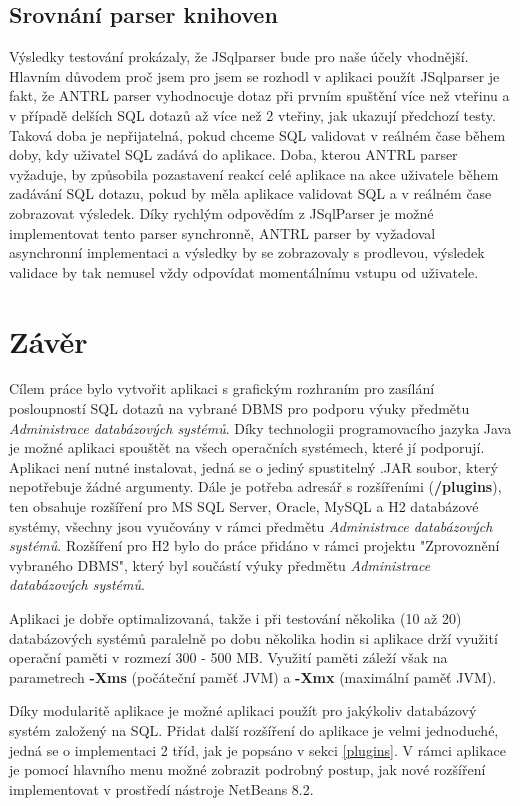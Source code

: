\documentclass[czech,bachelor,public,dept460,male,cpdeclaration,twoside]{diploma}
\begin{document}
\subsection{Srovnání parser knihoven}
Výsledky testování prokázaly, že JSqlparser bude pro naše účely vhodnější. Hlavním důvodem proč jsem pro jsem se rozhodl v aplikaci použít JSqlparser je fakt, že ANTRL parser vyhodnocuje dotaz při prvním spuštění více než vteřinu a v případě delších SQL dotazů až více než 2 vteřiny, jak ukazují předchozí testy. Taková doba je nepřijatelná, pokud chceme SQL validovat v reálném čase během doby, kdy uživatel SQL zadává do aplikace. Doba, kterou ANTRL parser vyžaduje, by způsobila pozastavení reakcí celé aplikace na akce uživatele během zadávání SQL dotazu, pokud by měla aplikace validovat SQL a v reálném čase zobrazovat výsledek. Díky rychlým odpovědím z JSqlParser je možné implementovat tento parser synchronně, ANTRL parser by vyžadoval asynchronní implementaci a výsledky by se zobrazovaly s prodlevou, výsledek validace by tak nemusel vždy odpovídat momentálnímu vstupu od uživatele.




\section{Závěr}
Cílem práce bylo vytvořit aplikaci s grafickým rozhraním pro zasílání posloupností SQL dotazů na vybrané DBMS pro podporu výuky předmětu \textit{Administrace databázových systémů}. Díky technologii programovacího jazyka Java je možné aplikaci spouštět na všech operačních systémech, které jí podporují. Aplikaci není nutné instalovat, jedná se o jediný spustitelný .JAR soubor, který nepotřebuje žádné argumenty. Dále je potřeba adresář s rozšířeními (\textbf{/plugins}), ten obsahuje rozšíření pro MS SQL Server, Oracle, MySQL a H2 databázové systémy, všechny jsou vyučovány v rámci předmětu \textit{Administrace databázových systémů}. Rozšíření pro H2 bylo do práce přidáno v rámci projektu "Zprovoznění vybraného DBMS", který byl součástí výuky předmětu \textit{Administrace databázových systémů}.

Aplikaci je dobře optimalizovaná, takže i při testování několika (10 až 20) databázových systémů paralelně po dobu několika hodin si aplikace drží využití operační paměti v rozmezí 300 - 500 MB. Využití paměti záleží však na parametrech \textbf{-Xms} (počáteční paměť JVM) a \textbf{-Xmx} (maximální paměť JVM).

Díky modularitě aplikace je možné aplikaci použít pro jakýkoliv databázový systém založený na SQL. Přidat další rozšíření do aplikace je velmi jednoduché, jedná se o implementaci 2 tříd, jak je popsáno v sekci \ref{plugins}. V rámci aplikace je pomocí hlavního menu možné zobrazit podrobný postup, jak nové rozšíření implementovat v prostředí nástroje NetBeans 8.2.
\end{document}
